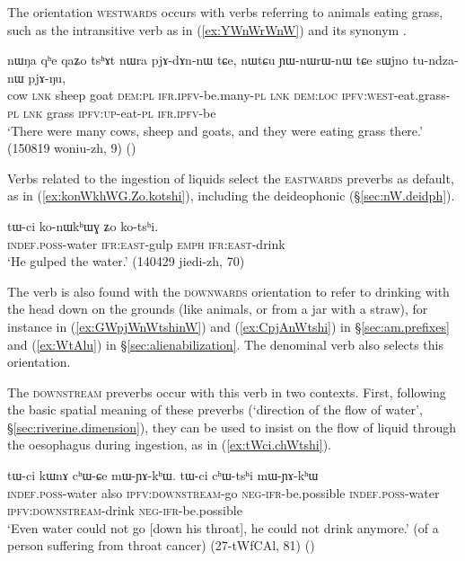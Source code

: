 The orientation \textsc{westwards} occurs with verbs referring to animals eating grass, such as the intransitive verb  as in (\ref{ex:YWnWrWnW}) and its synonym .

\begin{exe}
\ex \label{ex:YWnWrWnW}
\gll  nɯŋa qʰe qaʑo tsʰɤt nɯra pjɤ-dɤn-nɯ tɕe, nɯtɕu ɲɯ-nɯrɯ-nɯ tɕe sɯjno tu-ndza-nɯ pjɤ-ŋu, \\
cow \textsc{lnk} sheep goat \textsc{dem}:\textsc{pl} \textsc{ifr}.\textsc{ipfv}-be.many-\textsc{pl} \textsc{lnk} \textsc{dem}:\textsc{loc} \textsc{ipfv}:\textsc{west}-eat.grass-\textsc{pl} \textsc{lnk} grass \textsc{ipfv}:\textsc{up}-eat-\textsc{pl} \textsc{ifr}.\textsc{ipfv}-be \\
\glt  `There were many cows, sheep and goats, and they were eating grass there.' (150819 woniu-zh, 9)
()
\end{exe}

Verbs related to the ingestion of liquids select the \textsc{eastwards} preverbs as default, as in (\ref{ex:konWkhWG.Zo.kotshi}), including the deideophonic  (§\ref{sec:nW.deidph}).

\begin{exe}
\ex \label{ex:konWkhWG.Zo.kotshi}
\gll tɯ-ci ko-nɯkʰɯɣ ʑo ko-tsʰi. \\
\textsc{indef}.\textsc{poss}-water \textsc{ifr}:\textsc{east}-gulp \textsc{emph} \textsc{ifr}:\textsc{east}-drink \\
\glt `He gulped the water.' (140429 jiedi-zh, 70)
\end{exe}

The verb  is also found with the \textsc{downwards} orientation to refer to drinking with the head down on the grounds (like animals, or from a jar with a straw), for instance in (\ref{ex:GWpjWnWtshinW}) and (\ref{ex:CpjAnWtshi}) in §\ref{sec:am.prefixes} and (\ref{ex:WtAlu}) in §\ref{sec:alienabilization}. The denominal verb  also selects this orientation.

The \textsc{downstream} preverbs occur with this verb in two contexts. First,  following the basic spatial meaning of these preverbs (`direction of the flow of water', §\ref{sec:riverine.dimension}), they can be used to insist on the flow of liquid through the oesophagus during ingestion, as in (\ref{ex:tWci.chWtshi}). 

\begin{exe}
\ex \label{ex:tWci.chWtshi}
\gll tɯ-ci kɯnɤ cʰɯ-ɕe mɯ-ɲɤ-kʰɯ. tɯ-ci cʰɯ-tsʰi mɯ-ɲɤ-kʰɯ \\
\textsc{indef}.\textsc{poss}-water also \textsc{ipfv}:\textsc{downstream}-go \textsc{neg}-\textsc{ifr}-be.possible \textsc{indef}.\textsc{poss}-water \textsc{ipfv}:\textsc{downstream}-drink \textsc{neg}-\textsc{ifr}-be.possible \\
\glt `Even water could not go [down his throat], he could not drink anymore.' (of a person suffering from throat cancer) (27-tWfCAl, 81) ()
\end{exe}


